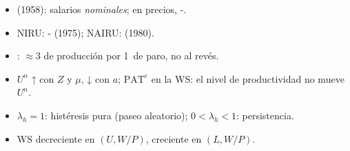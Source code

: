 \documentclass{article}
\begin{document}
\begin{columnas}
\begin{trampa}
\begin{itemize}
\item {} (1958): salarios \emph{nominales}; en precios, -.
\item NIRU: - (1975); NAIRU:  (1980).
\item {}: $\approx3$ de producción por 1~de paro, no al revés.
\item $U^n$ ↑ con $Z$ y $\mu$, ↓ con $a$; $\mathrm{PAT}^e$ en la WS: el nivel de productividad no mueve $U^n$.
\item $\lambda_h=1$: histéresis pura (paseo aleatorio); $0<\lambda_h<1$: persistencia.
\item WS decreciente en $(U,W/P)$, creciente en $(L,W/P)$.
\end{itemize}
\end{trampa}

\end{columnas}
\end{document}
